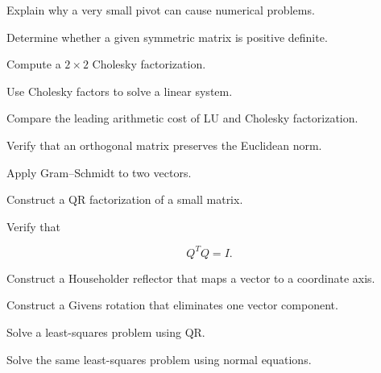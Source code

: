 \begin{exercise}[3]
Explain why a very small pivot can cause numerical problems.
\end{exercise}

\begin{exercise}[2]
Determine whether a given symmetric matrix is positive definite.
\end{exercise}

\begin{exercise}[3]
Compute a \(2\times2\) Cholesky factorization.
\end{exercise}

\begin{exercise}[3]
Use Cholesky factors to solve a linear system.
\end{exercise}

\begin{exercise}[3]
Compare the leading arithmetic cost of LU and Cholesky factorization.
\end{exercise}

\begin{exercise}[2]
Verify that an orthogonal matrix preserves the Euclidean norm.
\end{exercise}

\begin{exercise}[3]
Apply Gram--Schmidt to two vectors.
\end{exercise}

\begin{exercise}[3]
Construct a QR factorization of a small matrix.
\end{exercise}

\begin{exercise}[3]
Verify that

\[
Q^TQ=I.
\]
\end{exercise}

\begin{exercise}[3]
Construct a Householder reflector that maps a vector to a coordinate axis.
\end{exercise}

\begin{exercise}[3]
Construct a Givens rotation that eliminates one vector component.
\end{exercise}

\begin{exercise}[3]
Solve a least-squares problem using QR.
\end{exercise}

\begin{exercise}[3]
Solve the same least-squares problem using normal equations.
\end{exercise}

